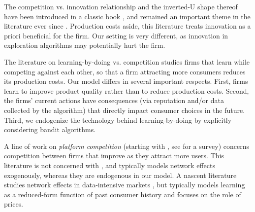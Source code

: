 

 The competition vs. innovation relationship and the inverted-U shape thereof have been introduced in a classic book \citep{Schumpeter-42}, and remained an important theme in the literature ever since \cite[\eg][]{aghion2005competition,Vives-08}. Production costs aside, this literature treats innovation as a priori beneficial for the firm. Our setting is very different, as innovation in exploration algorithms may potentially hurt the firm.

The literature on learning-by-doing vs. competition \citep[\eg][]{fudenberg1983learning, dasgupta1988learning, cabral1994learning} 
studies firms that learn while competing against each other, so that a firm attracting more consumers reduces its production costs. Our model differs in several important respects. First, firms learn to improve product quality rather than to reduce production costs. Second, the firms' current actions have consequences (via reputation and/or data collected by the algorithm) that directly impact consumer choices in the future. Third, we endogenize the technology behind learning-by-doing by explicitly considering bandit algorithms.


A line of work on \emph{platform competition} (starting with \cite{Rysman09}, see \citet{Weyl-White-14} for a survey) concerns competition between firms that improve as they attract more users. This literature is not concerned with \innovation, and typically models network effects exogenously, whereas they are endogenous in our model.
A nascent literature studies
network effects
in data-intensive markets \citep{prufer2017competing, hagiu2020data}, but typically models learning as a reduced-form function of past consumer history and focuses on the role of prices.

